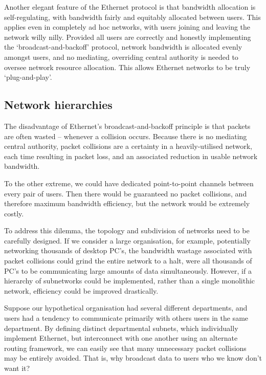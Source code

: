 \documentclass[aps,rmp,twocolumn,amsmath,amssymb,nofootinbib,superscriptaddress,longbibliography,floatfix]{revtex4-1}
\begin{document}
Another elegant feature of the Ethernet protocol is that bandwidth allocation is self-regulating, with bandwidth fairly and equitably allocated between users. This applies even in completely ad hoc networks, with users joining and leaving the network willy nilly. Provided all users are correctly and honestly implementing the `broadcast-and-backoff' protocol, network bandwidth is allocated evenly amongst users, and no mediating, overriding central authority is needed to oversee network resource allocation. This allows Ethernet networks to be truly `plug-and-play'.

%
%

\subsection{Network hierarchies}

The disadvantage of Ethernet's broadcast-and-backoff principle is that packets are often wasted -- whenever a collision occurs. Because there is no mediating central authority, packet collisions are a certainty in a heavily-utilised network, each time resulting in packet loss, and an associated reduction in usable network bandwidth.

To the other extreme, we could have dedicated point-to-point channels between every pair of users. Then there would be guaranteed no packet collisions, and therefore maximum bandwidth efficiency, but the network would be extremely costly.

To address this dilemma, the topology and subdivision of networks need to be carefully designed. If we consider a large organisation, for example, potentially networking thousands of desktop PC's, the bandwidth wastage associated with packet collisions could grind the entire network to a halt, were all thousands of PC's to be communicating large amounts of data simultaneously. However, if a hierarchy of subnetworks could be implemented, rather than a single monolithic network, efficiency could be improved drastically.

Suppose our hypothetical organisation had several different departments, and users had a tendency to communicate primarily with others users in the same department. By defining distinct departmental subnets, which individually implement Ethernet, but interconnect with one another using an alternate routing framework, we can easily see that many unnecessary packet collisions may be entirely avoided. That is, why broadcast data to users who we know don't want it?
\end{document}
